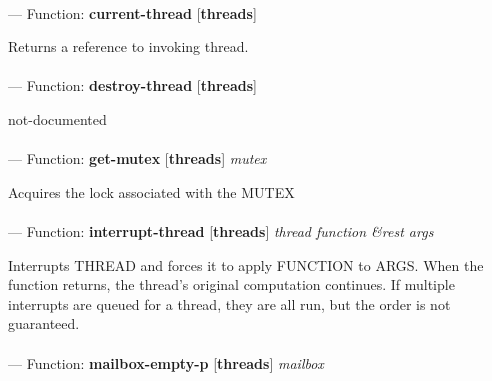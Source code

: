 \paragraph{}
\label{THREADS:CURRENT-THREAD}
--- Function: \textbf{current-thread} [\textbf{threads}] \textit{}

\begin{adjustwidth}{5em}{5em}
Returns a reference to invoking thread.
\end{adjustwidth}

\paragraph{}
\label{THREADS:DESTROY-THREAD}
--- Function: \textbf{destroy-thread} [\textbf{threads}] \textit{}

\begin{adjustwidth}{5em}{5em}
not-documented
\end{adjustwidth}

\paragraph{}
\label{THREADS:GET-MUTEX}
--- Function: \textbf{get-mutex} [\textbf{threads}] \textit{mutex}

\begin{adjustwidth}{5em}{5em}
Acquires the lock associated with the MUTEX
\end{adjustwidth}

\paragraph{}
\label{THREADS:INTERRUPT-THREAD}
--- Function: \textbf{interrupt-thread} [\textbf{threads}] \textit{thread function \&rest args}

\begin{adjustwidth}{5em}{5em}
Interrupts THREAD and forces it to apply FUNCTION to ARGS.
When the function returns, the thread's original computation continues. If  multiple interrupts are queued for a thread, they are all run, but the order is not guaranteed.
\end{adjustwidth}

\paragraph{}
\label{THREADS:MAILBOX-EMPTY-P}
--- Function: \textbf{mailbox-empty-p} [\textbf{threads}] \textit{mailbox}

